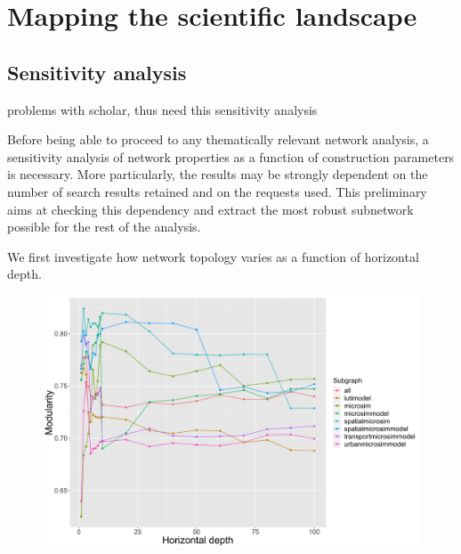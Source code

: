 \section*{Mapping the scientific landscape}

\subsection*{Sensitivity analysis}

\cite{MartinMartin2016} problems with scholar, thus need this sensitivity analysis


Before being able to proceed to any thematically relevant network analysis, a sensitivity analysis of network properties as a function of construction parameters is necessary. More particularly, the results may be strongly dependent on the number of search results retained and on the requests used. This preliminary aims at checking this dependency and extract the most robust subnetwork possible for the rest of the analysis.

We first investigate how network topology varies as a function of horizontal depth.


\begin{figure}
    \centering
    \includegraphics[width=\linewidth]{figures/sensitivity_fullnw_hdmax100_subnws_modularity.png}
    \caption{}
    \label{fig:modularity-hdepth}
\end{figure}


